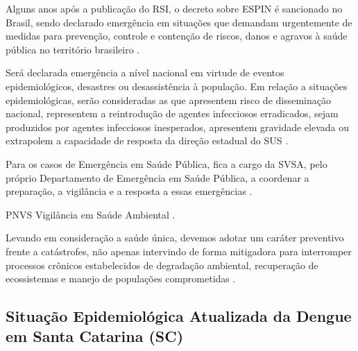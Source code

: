 \indent Alguns anos após a publicação do \acrshort{RSI}, o decreto sobre \acrfull{ESPIN} é sancionado no Brasil, sendo declarado emergência em situações que demandam urgentemente de medidas para prevenção, controle e contenção de riscos, danos e agravos à saúde pública no território brasileiro \cite{Brasil2011ESPIN}.

\indent Será declarada emergência a nível nacional em virtude de eventos epidemiológicos, desastres ou desassistência à população. Em relação a situações epidemiológicas, serão consideradas as que apresentem risco de disseminação nacional, representem a reintrodução de agentes infecciosos erradicados, sejam produzidos por agentes infecciosos inesperados, apresentem gravidade elevada ou extrapolem a capacidade de resposta da direção estadual do \acrfull{SUS} \cite{Brasil2011ESPIN}.

\indent Para os casos de Emergência em Saúde Pública, fica a cargo da \acrfull{SVSA}, pelo próprio Departamento de Emergência em Saúde Pública, a coordenar a preparação, a vigilância e a resposta a essas emergências \cite{SVSA2023_2}.

\indent \acrfull{PNVS}\cite{Brasil2018PNVS} Vigilância em Saúde Ambiental \cite{GuiaVigSaúde22}.

\indent Levando em consideração a saúde única, devemos adotar um caráter preventivo frente a catástrofes, não apenas  intervindo de forma mitigadora para interromper processos crônicos estabelecidos de degradação ambiental, recuperação de ecossistemas e manejo de populações comprometidas \cite{Cubas2014Tratado}.

\subsection{Situação Epidemiológica Atualizada da Dengue em Santa Catarina (SC)}


